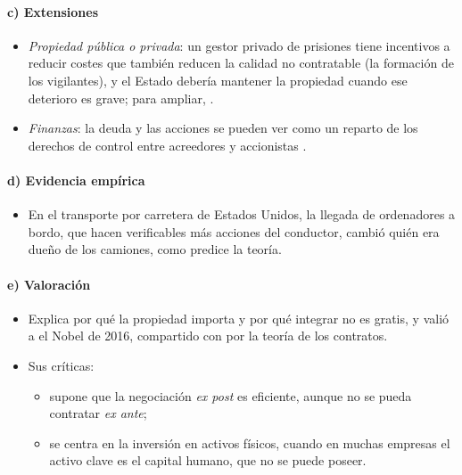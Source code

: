 \documentclass[11pt]{article}
\begin{document}
\paragraph{c) Extensiones}

\begin{itemize}
\item \emph{Propiedad pública o privada}: un gestor privado de prisiones tiene incentivos a reducir costes que también reducen la calidad no contratable (la formación de los vigilantes), y el Estado debería mantener la propiedad cuando ese deterioro es grave\nocite{HartShleiferVishny1997Proper}; para ampliar, .
\item \emph{Finanzas}: la deuda y las acciones se pueden ver como un reparto de los derechos de control entre acreedores y accionistas .
\end{itemize}

\paragraph{d) Evidencia empírica}

\begin{itemize}
\item En el transporte por carretera de Estados Unidos, la llegada de ordenadores a bordo, que hacen verificables más acciones del conductor, cambió quién era dueño de los camiones, como predice la teoría\nocite{BakerHubbard2003Make}.
\end{itemize}

\paragraph{e) Valoración}

\begin{itemize}
\item Explica por qué la propiedad importa y por qué integrar no es gratis, y valió a  el Nobel de 2016, compartido con  por la teoría de los contratos.
\item Sus críticas:
  \begin{itemize}
  \item supone que la negociación \emph{ex post} es eficiente, aunque no se pueda contratar \emph{ex ante}\nocite{Hart2017Incomplete};
  \item se centra en la inversión en activos físicos, cuando en muchas empresas el activo clave es el capital humano, que no se puede poseer.
  \end{itemize}
\end{itemize}
\end{document}
